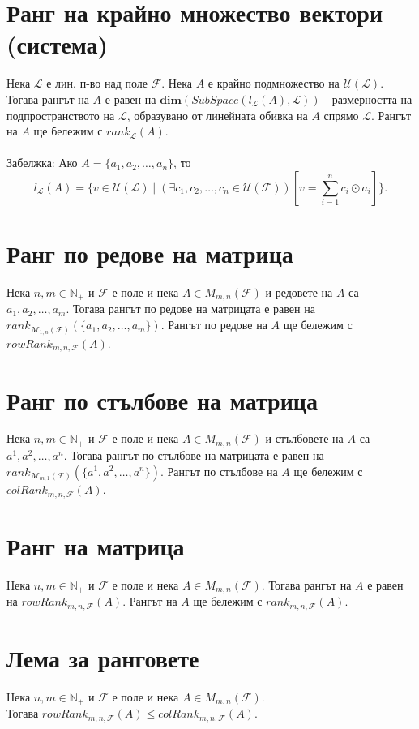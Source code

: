 \documentclass[a4paper,9pt]{extarticle}
\newcommand{\Nat}{\mathbb{N}}
\newcommand{\F}{\mathcal{F}}
\newcommand{\Uni}{\mathcal{U}}
\newcommand{\dimention}{\mathbf{dim}}
\begin{document}
\section{Ранг на крайно множество вектори (система)}
Нека \(\mathcal L\) е лин. п-во над поле \(\F\). Нека \(A\) е крайно подмножество на \(\Uni(\mathcal L)\).
Тогава рангът на \(A\) е равен на \(\dimention(SubSpace(l_\mathcal{L}(A), \mathcal L))\) - размерността на подпространството на \(\mathcal L\), образувано от линейната обивка на \(A\) спрямо \(\mathcal L\).
Рангът на \(A\) ще бележим с \(rank_\mathcal{L}(A)\).\\\\
Забелжка: Ако \(A = \{a_1, a_2, \dots, a_n\}\), то \[l_\mathcal{L}(A) = \{v \in \Uni(\mathcal L) \mid (\exists c_1, c_2, \dots, c_n \in \Uni(\F))[v = \displaystyle\sum_{i = 1}^n c_i \odot a_i] \}.\]

\section{Ранг по редове на матрица}
Нека \(n, m \in \Nat_+\) и \(\F\) е поле и нека \(A \in M_{m, n}(\F)\) и редовете на \(A\) са \(a_1, a_2, \dots, a_m\).
Тогава рангът по редове на матрицата е равен на \(rank_{\mathcal{M}_{1, n}(\F)}(\{a_1, a_2, \dots, a_m\})\).
Рангът по редове на \(A\) ще бележим с \(rowRank_{m, n, \F}(A)\).

\section{Ранг по стълбове на матрица}
Нека \(n, m \in \Nat_+\) и \(\F\) е поле и нека \(A \in M_{m, n}(\F)\) и стълбовете на \(A\) са \(a^1, a^2, \dots, a^n\).
Тогава рангът по стълбове на матрицата е равен на \(rank_{\mathcal{M}_{m, 1}(\F)}(\{a^1, a^2, \dots, a^n\})\).
Рангът по стълбове на \(A\) ще бележим с \(colRank_{m, n, \F}(A)\).

\section{Ранг на матрица}
Нека \(n, m \in \Nat_+\) и \(\F\) е поле и нека \(A \in M_{m, n}(\F)\).
Тогава рангът на \(A\) е равен на \(rowRank_{m, n, \F}(A)\).
Рангът на \(A\) ще бележим с \(rank_{m, n, \F}(A)\).

\section{Лема за ранговете}
Нека \(n, m \in \Nat_+\) и \(\F\) е поле и нека \(A \in M_{m, n}(\F)\). \\
Тогава \(rowRank_{m, n, \F}(A) \leq colRank_{m, n, \F}(A)\).
\end{document}
